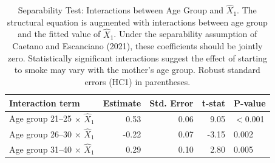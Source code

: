 \begin{table}[h!]
\centering
\caption{Separability Test: Interactions between Age Group and $\hat{X}_1$. The structural equation is augmented with interactions between age group and the fitted value of $\hat{X}_1$. Under the separability assumption of Caetano and Escanciano (2021), these coefficients should be jointly zero. Statistically significant interactions suggest the effect of starting to smoke may vary with the mother's age group. Robust standard errors (HC1) in parentheses.} 
\label{tab:separability}
\begingroup\small
\begin{tabular}{lrrrl}
  \toprule
Interaction term & Estimate & Std. Error & t-stat & P-value \\ 
  \midrule
Age group 21--25 $\times$ $\hat{X}_1$ & 0.53 & 0.06 & 9.05 & $<$0.001 \\ 
  Age group 26--30 $\times$ $\hat{X}_1$ & -0.22 & 0.07 & -3.15 & 0.002 \\ 
  Age group 31--40 $\times$ $\hat{X}_1$ & 0.29 & 0.10 & 2.80 & 0.005 \\ 
   \bottomrule
\end{tabular}
\endgroup
\end{table}

